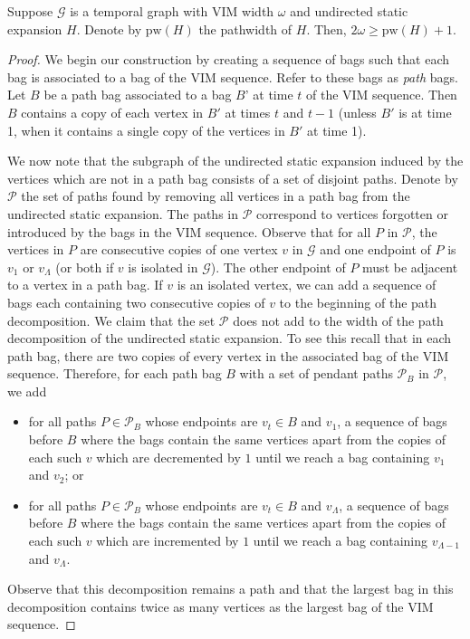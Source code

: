 \documentclass[a4paper,UKenglish,cleveref, autoref, thm-restate]{lipics-v2021} %
\begin{document}
\begin{theoremrep}\label{thm:vimw-bounded-pw-static}
    Suppose $\mathcal{G}$ is a temporal graph with VIM width $\omega$ and undirected static expansion $H$. Denote by $\mathrm{pw}(H)$ the pathwidth of $H$. Then, $2\omega\geq \mathrm{pw}(H)+1$.
\end{theoremrep}
\begin{proof}
    We begin our construction by creating a sequence of bags such that each bag is associated to a bag of the VIM sequence. Refer to these bags as \emph{path} bags. Let $B$ be a path bag associated to a bag $B$' at time $t$ of the VIM sequence. Then $B$ contains a copy of each vertex in $B'$ at times $t$ and $t-1$ (unless $B'$ is at time 1, when it contains a single copy of the vertices in $B'$ at time 1). 

We now note that the subgraph of the undirected static expansion induced by the vertices which are not in a path bag consists of a set of disjoint paths. Denote by $\mathcal{P}$ the set of paths found by removing all vertices in a path bag from the undirected static expansion. The paths in $\mathcal{P}$ correspond to vertices forgotten or introduced by the bags in the VIM sequence. Observe that for all $P$ in $\mathcal{P}$, the vertices in $P$ are consecutive copies of one vertex $v$ in $\mathcal{G}$ and one endpoint of $P$ is $v_{1}$ or $v_{\Lambda}$ (or both if $v$ is isolated in $\mathcal{G}$). The other endpoint of $P$ must be adjacent to a vertex in a path bag. If $v$ is an isolated vertex, we can add a sequence of bags each containing two consecutive copies of $v$ to the beginning of the path decomposition. We claim that the set $\mathcal{P}$ does not add to the width of the path decomposition of the undirected static expansion. To see this recall that in each path bag, there are two copies of every vertex in the associated bag of the VIM sequence. Therefore, for each path bag $B$ with a set of pendant paths $\mathcal{P}_B$ in $\mathcal{P}$, we add 
\begin{itemize}
    \item for all paths $P\in \mathcal{P}_B$ whose endpoints are $v_t\in B$ and $v_1$, a sequence of bags before $B$ where the bags contain the same vertices apart from the copies of each such $v$ which are decremented by $1$ until we reach a bag containing $v_1$ and $v_2$; or
    \item for all paths $P\in \mathcal{P}_B$ whose endpoints are $v_t\in B$ and $v_{\Lambda}$, a sequence of bags before $B$ where the bags contain the same vertices apart from the copies of each such $v$ which are incremented by $1$ until we reach a bag containing $v_{\Lambda-1}$ and $v_{\Lambda}$.
\end{itemize}
Observe that this decomposition remains a path and that the largest bag in this decomposition contains twice as many vertices as the largest bag of the VIM sequence.


\end{proof}
\end{document}

